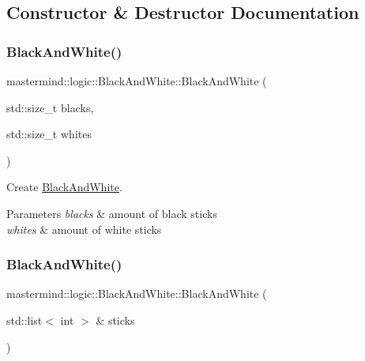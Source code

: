 \subsection{Constructor \& Destructor Documentation}
\hypertarget{classmastermind_1_1logic_1_1_black_and_white_a4dbd770b9f1ba3bef45ebba9fc01dcf4}{}\label{classmastermind_1_1logic_1_1_black_and_white_a4dbd770b9f1ba3bef45ebba9fc01dcf4} 
\subsubsection{\texorpdfstring{Black\+And\+White()}{BlackAndWhite()}\hspace{0.1cm}{\footnotesize\ttfamily [1/2]}}
{\footnotesize\ttfamily mastermind\+::logic\+::\+Black\+And\+White\+::\+Black\+And\+White (\begin{DoxyParamCaption}\item[{std\+::size\+\_\+t}]{blacks,  }\item[{std\+::size\+\_\+t}]{whites }\end{DoxyParamCaption})}



Create \hyperlink{classmastermind_1_1logic_1_1_black_and_white}{Black\+And\+White}. 


\begin{DoxyParams}{Parameters}
{\em blacks} & amount of black sticks \\
\hline
{\em whites} & amount of white sticks \\
\hline
\end{DoxyParams}
\hypertarget{classmastermind_1_1logic_1_1_black_and_white_af6fc312cb65dcb1cc53f6e75cf45861d}{}\label{classmastermind_1_1logic_1_1_black_and_white_af6fc312cb65dcb1cc53f6e75cf45861d} 
\subsubsection{\texorpdfstring{Black\+And\+White()}{BlackAndWhite()}\hspace{0.1cm}{\footnotesize\ttfamily [2/2]}}
{\footnotesize\ttfamily mastermind\+::logic\+::\+Black\+And\+White\+::\+Black\+And\+White (\begin{DoxyParamCaption}\item[{std\+::list$<$ int $>$ \&}]{sticks }\end{DoxyParamCaption})}



